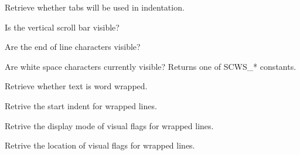 
Retrieve whether tabs will be used in indentation.


\label{wxstyledtextctrlgetuseverticalscrollbar}


Is the vertical scroll bar visible?


\label{wxstyledtextctrlgetvieweol}


Are the end of line characters visible?


\label{wxstyledtextctrlgetviewwhitespace}


Are white space characters currently visible?
Returns one of SCWS\_* constants.


\label{wxstyledtextctrlgetwrapmode}


Retrieve whether text is word wrapped.


\label{wxstyledtextctrlgetwrapstartindent}


Retrive the start indent for wrapped lines.


\label{wxstyledtextctrlgetwrapvisualflags}


Retrive the display mode of visual flags for wrapped lines.


\label{wxstyledtextctrlgetwrapvisualflagslocation}


Retrive the location of visual flags for wrapped lines.


\label{wxstyledtextctrlgetxoffset}



\label{wxstyledtextctrlgetzoom}

